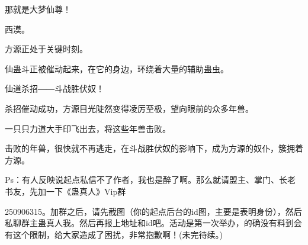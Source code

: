 \begin{this_body}
那就是大梦仙尊！

西漠。

方源正处于关键时刻。

仙蛊斗正被催动起来，在它的身边，环绕着大量的辅助蛊虫。

仙道杀招――斗战胜伏奴！

杀招催动成功，方源目光陡然变得凌厉至极，望向眼前的众多年兽。

一只只力道大手印飞出去，将这些年兽击败。

击败的年兽，很快就不再逃走，在斗战胜伏奴的影响下，成为方源的奴仆，簇拥着方源。

Ps：有人反映说起点私信不了作者，我也是醉了啊。那么就请盟主、掌门、长老书友，先加一下《蛊真人》Vip群

250906315。加群之后，请先截图（你的起点后台的id图，主要是表明身份），然后私聊群主蛊真人我。然后再报上地址和id吧。活动是第一次举办，的确没有料到会有这个限制，给大家造成了困扰，非常抱歉啊！(未完待续。)

\end{this_body}

